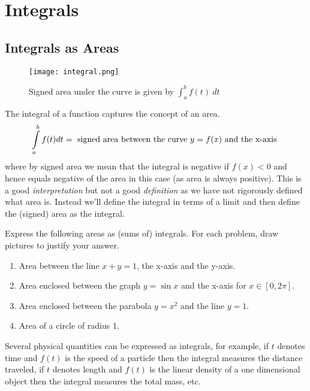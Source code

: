
\section{Integrals}
\subsection{Integrals as Areas}

\begin{figure}[H]
	\centering
	\texttt{[image: integral.png]}
	\caption*{Signed area under the curve is given by $\int_a^b f(t)\:dt$}
\end{figure}
The integral of a function captures the concept of an area.
\begin{align*}
	\int \limits_{a}^b f(t) dt = \mbox{ signed area between the curve $y=f(x)$ and the x-axis \strut}
\end{align*}
where by signed area we mean that the integral is negative if $f(x) < 0$ and hence equals negative of the area in this case (as area is always positive). This is a good {\it interpretation} but not a good {\it definition} as we have not rigorously defined what area is.
Instead we'll define the integral in terms of a limit and then define the (signed) area as the integral.

\begin{exercise}
	Express the following areas as (sums of) integrals. For each problem, draw pictures to justify your answer.
	\begin{enumerate}
		\item Area between the line $x + y = 1$, the x-axis and the y-axis.
		\item Area enclosed between the graph $y = \sin x$ and the x-axis for $x \in [0,2\pi]$.
		\item Area enclosed between the parabola $y=x^2$ and the line $y=1$.
		\item Area of a circle of radius 1.
	\end{enumerate}
\end{exercise}
Several physical quantities can be expressed as integrals, for example,
if $t$ denotes time and $f(t)$ is the speed of a particle then the integral measures the distance traveled, if $t$ denotes length and $f(t)$ is the linear density of a one dimensional object then the integral measures the total mass, etc.

